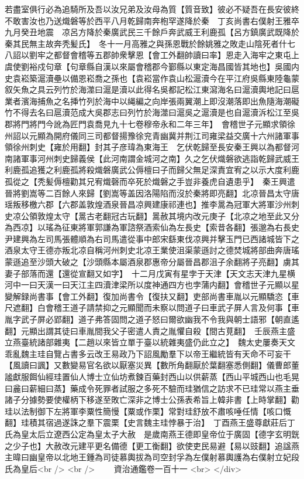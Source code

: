 若盡室俱行必為追騎所及吾以汝兄弟及汝母為質【質音致】彼必不疑吾在長安彼終不敢害汝也乃送熾磐等於西平八月乾歸南奔枹罕遂降於秦　丁亥尚書右僕射王雅卒　九月癸丑地震　凉呂方降於秦廣武民三千餘戶奔武威王利鹿孤【呂方鎮廣武既降於秦其民無主故奔秃髪氏】　冬十一月高雅之與孫恩戰於餘姚雅之敗走山陰死者什七八詔以劉牢之都督會稽等五郡帥衆擊恩【會工外翻帥讀曰率】恩走入海牢之東屯上虞使劉裕戍句章【句章縣自漢以來屬會稽郡今鄞縣以東定海昌國皆其地也】吳國内史袁崧築滬瀆壘以備恩崧喬之孫也【袁崧當作袁山松滬瀆今在平江府吳縣東陸龜蒙叙矢魚之具云列竹於海澨曰滬是瀆以此得名吳都記松江東瀉海名曰滬瀆輿地記曰扈業者濱海捕魚之名挿竹列於海中以䋲編之向岸張兩翼潮上即沒潮落即出魚隨海潮礙竹不得去名曰扈瀆范成大吳郡志曰列竹於海澨曰滬吳之滬瀆是也自滬瀆泝松江至吳郡將門將門今訛為匠門袁喬見九十七卷穆帝永和二年三年】　會稽世子元顯求領徐州詔以元顯為開府儀同三司都督揚豫徐兖青幽冀并荆江司雍梁益交廣十六州諸軍事領徐州刺史【雍於用翻】封其子彦瑋為東海王　乞伏乾歸至長安秦王興以為都督河南諸軍事河州刺史歸義侯【此河南謂金城河之南】久之乞伏熾磐欲逃詣乾歸武威王利鹿孤追獲之利鹿孤將殺熾磐廣武公傉檀曰子而歸父無足深責宜宥之以示大度利鹿孤從之【秃髪傉檀勸其兄宥熾磬而卒死於熾磐之手豈非養虎自遺患乎】　秦王興遣晉將劉嵩等二百餘人來歸【劉嵩等盖因洛陽陷而沒於秦將即亮翻】北凉晉昌太守唐瑶叛移檄六郡【六郡盖敦煌酒泉晉昌凉興建康祁連也】推李暠為冠軍大將軍沙州刺史凉公領敦煌太守【暠古老翻冠古玩翻】暠赦其境内改元庚子【北凉之地至此又分為西凉】以瑤為征東將軍郭謙為軍諮祭酒索仙為左長史【索昔各翻】張邈為右長史尹建興為左司馬張體順為右司馬遣從事中郎宋繇東伐凉興并擊玉門已西諸城皆下之酒泉太守王德亦叛北凉自稱河州刺史北凉王業使沮渠蒙遜討之德焚城將部曲奔唐瑤蒙遜追至沙頭大破之【沙頭縣本屬酒泉郡惠帝分屬晉昌郡沮子余翻將子亮翻】虜其妻子部落而還【還從宣翻又如字】　十二月戊寅有星孛于天津【天文志天津九星横河中一曰天漢一曰天江主四瀆津梁所以度神通四方也孛蒲内翻】會稽世子元顯以星變解録尚書事【會工外翻】復加尚書令【復扶又翻】吏部尚書車胤以元顯驕恣【車尺遮翻】白會稽王道子請禁抑之元顯聞而未察以問道子曰車武子屏人言及何事【車胤字武子屏必郢翻】道子弗答固問之道子怒曰爾欲幽我不令我與朝士語邪【朝直遙翻】元顯出謂其徒曰車胤間我父子密遣人責之胤懼自殺【間古莧翻】　壬辰燕主盛立燕臺統諸部雜夷【二趙以來皆立單于臺以統雜夷盛仍此立之】　魏太史屢奏天文乖亂魏主珪自覽占書多云改王易政乃下詔風勵羣下以帝王繼統皆有天命不可妄干【風讀曰諷】又數變易官名欲以厭塞災異【數所角翻厭於葉翻塞悉側翻】儀曹郎董謐獻服餌仙經珪置仙人博士立仙坊煮鍊百藥封西山以供薪蒸【西山平城西山也毛晃曰麄曰薪細曰蒸】藥成令死罪者試服之多死不驗而珪猶信之訪求不已珪常以燕主垂諸子分據勢要使權柄下移遂至敗亡深非之博士公孫表希旨上韓非書【上時掌翻】勸珪以法制御下左將軍李粟性簡慢【粟或作栗】常對珪舒放不肅咳唾任情【咳口慨翻】珪積其宿過遂誅之羣下震栗【史言魏主珪悖暴于治】　丁酉燕王盛尊獻莊后丁氏為皇太后立遼西公定為皇太子大赦　是歲南燕王德即皇帝位于廣固【德字玄明皝之少子也】大赦改元建平更名備德【更工衡翻】欲使吏民易避【易以豉翻】追諡燕主暐曰幽皇帝以北地王鍾為司徒慕輿拔為司空封孚為左僕射慕輿護為右僕射立妃段氏為皇后<br />
<br />
　　資治通鑑卷一百十一  <br>
   </div> 

